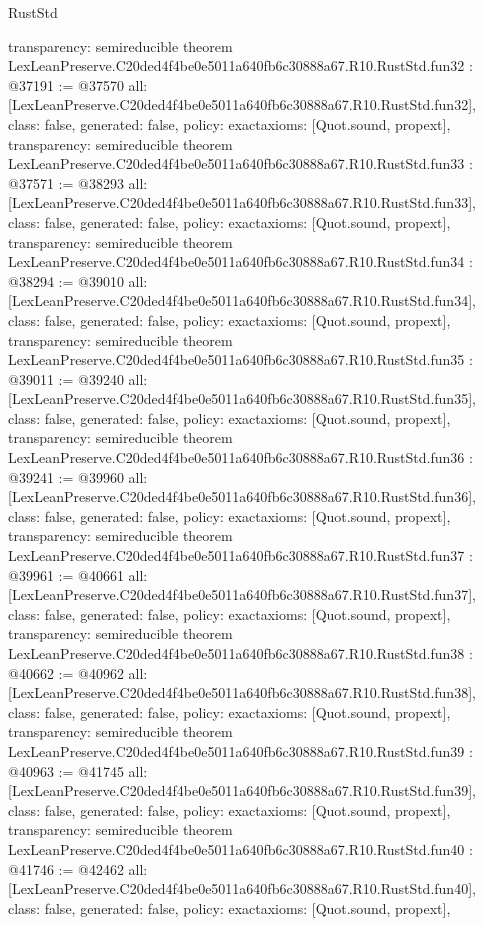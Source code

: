 \begin{lexlean}{RustStd}
\begin{coremodule}
{  transparency: semireducible
}
theorem LexLeanPreserve.C20ded4f4be0e5011a640fb6c30888a67.R10.RustStd.fun32 : @37191 := @37570 {
  all: [LexLeanPreserve.C20ded4f4be0e5011a640fb6c30888a67.R10.RustStd.fun32],
  class: false,
  generated: false,
  policy: exact{axioms: [Quot.sound, propext]},
  transparency: semireducible
}
theorem LexLeanPreserve.C20ded4f4be0e5011a640fb6c30888a67.R10.RustStd.fun33 : @37571 := @38293 {
  all: [LexLeanPreserve.C20ded4f4be0e5011a640fb6c30888a67.R10.RustStd.fun33],
  class: false,
  generated: false,
  policy: exact{axioms: [Quot.sound, propext]},
  transparency: semireducible
}
theorem LexLeanPreserve.C20ded4f4be0e5011a640fb6c30888a67.R10.RustStd.fun34 : @38294 := @39010 {
  all: [LexLeanPreserve.C20ded4f4be0e5011a640fb6c30888a67.R10.RustStd.fun34],
  class: false,
  generated: false,
  policy: exact{axioms: [Quot.sound, propext]},
  transparency: semireducible
}
theorem LexLeanPreserve.C20ded4f4be0e5011a640fb6c30888a67.R10.RustStd.fun35 : @39011 := @39240 {
  all: [LexLeanPreserve.C20ded4f4be0e5011a640fb6c30888a67.R10.RustStd.fun35],
  class: false,
  generated: false,
  policy: exact{axioms: [Quot.sound, propext]},
  transparency: semireducible
}
theorem LexLeanPreserve.C20ded4f4be0e5011a640fb6c30888a67.R10.RustStd.fun36 : @39241 := @39960 {
  all: [LexLeanPreserve.C20ded4f4be0e5011a640fb6c30888a67.R10.RustStd.fun36],
  class: false,
  generated: false,
  policy: exact{axioms: [Quot.sound, propext]},
  transparency: semireducible
}
theorem LexLeanPreserve.C20ded4f4be0e5011a640fb6c30888a67.R10.RustStd.fun37 : @39961 := @40661 {
  all: [LexLeanPreserve.C20ded4f4be0e5011a640fb6c30888a67.R10.RustStd.fun37],
  class: false,
  generated: false,
  policy: exact{axioms: [Quot.sound, propext]},
  transparency: semireducible
}
theorem LexLeanPreserve.C20ded4f4be0e5011a640fb6c30888a67.R10.RustStd.fun38 : @40662 := @40962 {
  all: [LexLeanPreserve.C20ded4f4be0e5011a640fb6c30888a67.R10.RustStd.fun38],
  class: false,
  generated: false,
  policy: exact{axioms: [Quot.sound, propext]},
  transparency: semireducible
}
theorem LexLeanPreserve.C20ded4f4be0e5011a640fb6c30888a67.R10.RustStd.fun39 : @40963 := @41745 {
  all: [LexLeanPreserve.C20ded4f4be0e5011a640fb6c30888a67.R10.RustStd.fun39],
  class: false,
  generated: false,
  policy: exact{axioms: [Quot.sound, propext]},
  transparency: semireducible
}
theorem LexLeanPreserve.C20ded4f4be0e5011a640fb6c30888a67.R10.RustStd.fun40 : @41746 := @42462 {
  all: [LexLeanPreserve.C20ded4f4be0e5011a640fb6c30888a67.R10.RustStd.fun40],
  class: false,
  generated: false,
  policy: exact{axioms: [Quot.sound, propext]},
}
\end{coremodule}
\end{lexlean}
